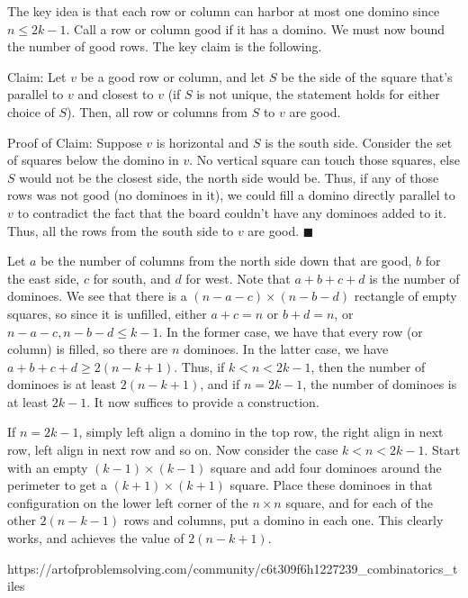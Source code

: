 \documentclass[a4paper]{article}
\begin{document}
\begin{question*}{}
{        The key idea is that each row or column can harbor at most one domino since $n\le 2k-1$. Call a row or column good if it has a domino. We must now bound the number of good rows. The key claim is the following.

        Claim: Let $v$ be a good row or column, and let $S$ be the side of the square that's parallel to $v$ and closest to $v$ (if $S$ is not unique, the statement holds for either choice of $S$). Then, all row or columns from $S$ to $v$ are good.

        Proof of Claim: Suppose $v$ is horizontal and $S$ is the south side. Consider the set of squares below the domino in $v$. No vertical square can touch those squares, else $S$ would not be the closest side, the north side would be. Thus, if any of those rows was not good (no dominoes in it), we could fill a domino directly parallel to $v$ to contradict the fact that the board couldn't have any dominoes added to it. Thus, all the rows from the south side to $v$ are good. $\blacksquare$

        Let $a$ be the number of columns from the north side down that are good, $b$ for the east side, $c$ for south, and $d$ for west. Note that $a+b+c+d$ is the number of dominoes. We see that there is a $(n-a-c)\times (n-b-d)$ rectangle of empty squares, so since it is unfilled, either $a+c=n$ or $b+d=n$, or $n-a-c,n-b-d\le k-1$. In the former case, we have that every row (or column) is filled, so there are $n$ dominoes. In the latter case, we have $a+b+c+d\ge 2(n-k+1)$. Thus, if $k<n<2k-1$, then the number of dominoes is at least $2(n-k+1)$, and if $n=2k-1$, the number of dominoes is at least $2k-1$. It now suffices to provide a construction.

        If $n=2k-1$, simply left align a domino in the top row, the right align in next row, left align in next row and so on. Now consider the case $k<n<2k-1$. Start with an empty $(k-1)\times(k-1)$ square and add four dominoes around the perimeter to get a $(k+1)\times(k+1)$ square. Place these dominoes in that configuration on the lower left corner of the $n\times n$ square, and for each of the other $2(n-k-1)$ rows and columns, put a domino in each one. This clearly works, and achieves the value of $2(n-k+1)$.
        }{%
        https://artofproblemsolving.com/community/c6t309f6h1227239_combinatorics_tiles
    }


\end{question*}
\end{document}
